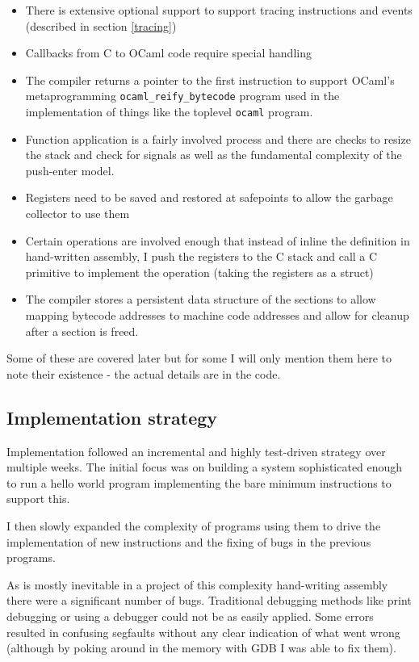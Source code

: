 \begin{itemize}
    \item There is extensive optional support to support tracing instructions and events (described
          in section \ref{tracing})
    \item Callbacks from C to OCaml code require special handling
    \item The compiler returns a pointer to the first instruction to support OCaml's
          metaprogramming \texttt{ocaml\_reify\_bytecode} program used in the implementation of
          things like the
          toplevel \texttt{ocaml} program.
    \item Function application is a fairly involved process and there are checks to resize the
          stack and check for signals as well as the fundamental complexity of the push-enter
          model.
    \item Registers need to be saved and restored at safepoints to allow the garbage collector to
          use them
    \item Certain operations are involved enough that instead of inline the definition in
          hand-written assembly, I push the registers to the C stack and call a C primitive to
          implement the
          operation (taking the registers as a struct)
    \item The compiler stores a persistent data structure of the sections to allow mapping bytecode
          addresses to
          machine code addresses and allow for cleanup after a section is freed.
\end{itemize}

Some of these are covered later but for some I will only mention them here to note their existence
- the actual details are in the code.

\subsection{Implementation strategy}

Implementation followed an incremental and highly test-driven strategy over multiple weeks. The
initial focus was on building a system sophisticated enough to run a hello world program
implementing the bare minimum instructions to support this.

I then slowly expanded the complexity of programs using them to drive the implementation of new
instructions and the fixing of bugs in the previous programs.

As is mostly inevitable in a project of this complexity hand-writing assembly there were a
significant number of bugs. Traditional debugging methods like print debugging or using a debugger
could not be as easily applied. Some errors resulted in confusing segfaults without any clear
indication
of what went wrong (although by poking around in the memory with GDB I was able to fix them).

